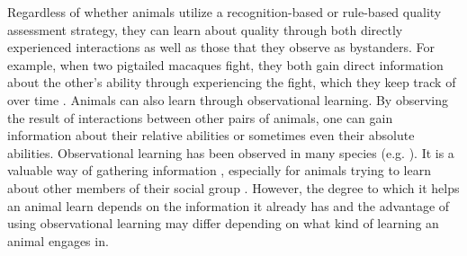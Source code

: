 
Regardless of whether animals utilize a recognition-based or rule-based quality assessment strategy, they can learn about quality through both directly experienced interactions as well as those that they observe as bystanders. For example, when two pigtailed macaques fight, they both gain direct information about the other's ability through experiencing the fight, which they keep track of over time \citep{Flack:2006uq}. Animals can also learn through observational learning. By observing the result of interactions between other pairs of animals, one can gain information about their relative abilities or sometimes even their absolute abilities. Observational learning has been observed in many species (e.g. \citep{Gaudet:1984cr,Holekamp:1991nx,Fiorito:1992ve,Marchetti:2000dq,Bugnyar:2002qf,Hopper:2008bh,Hobson:2015uq}). It is a valuable way of gathering information \citep{Holekamp:1991nx,Schaik:2011oq,Seyfarth2015SocialCognition}, especially for animals trying to learn about other members of their social group \citep{Freeman:1985kl,Holekamp:1991nx,Hobson:2015uq}. However, the degree to which it helps an animal learn depends on the information it already has and the advantage of using observational learning may differ depending on what kind of learning an animal engages in.

